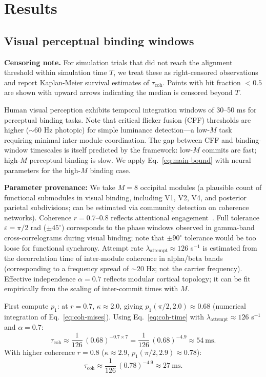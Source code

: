 \documentclass[12pt]{article}
\begin{document}
\section{Results}

\subsection{Visual perceptual binding windows}

\textbf{Censoring note.} For simulation trials that did not reach the alignment threshold within simulation time $T$, we treat these as right-censored observations and report Kaplan-Meier survival estimates of $\tau_{\mathrm{coh}}$. Points with hit fraction $< 0.5$ are shown with upward arrows indicating the median is censored beyond $T$.

Human visual perception exhibits temporal integration windows of 30--50 ms for perceptual binding tasks. Note that critical flicker fusion (CFF) thresholds are higher ($\sim$60 Hz photopic) for simple luminance detection---a low-$M$ task requiring minimal inter-module coordination. The gap between CFF and binding-window timescales is itself predicted by the framework: low-$M$ commits are fast; high-$M$ perceptual binding is slow. We apply Eq.~\ref{eq:main-bound} with neural parameters for the high-$M$ binding case.

\textbf{Parameter provenance:} We take $M=8$ occipital modules (a plausible count of functional submodules in visual binding, including V1, V2, V4, and posterior parietal subdivisions; can be estimated via community detection on coherence networks). Coherence $r=0.7$--$0.8$ reflects attentional engagement~\cite{fries2015}. Full tolerance $\varepsilon=\pi/2$ rad ($\pm 45^\circ$) corresponds to the phase windows observed in gamma-band cross-correlograms during visual binding; note that $\pm 90^\circ$ tolerance would be too loose for functional synchrony. Attempt rate $\lambda_{\mathrm{attempt}} \approx 126$ s$^{-1}$ is estimated from the decorrelation time of inter-module coherence in alpha/beta bands (corresponding to a frequency spread of $\sim 20$ Hz; not the carrier frequency). Effective independence $\alpha=0.7$ reflects modular cortical topology; it can be fit empirically from the scaling of inter-commit times with $M$.

First compute $p_1$: at $r=0.7$, $\kappa \approx 2.0$, giving $p_1(\pi/2, 2.0) \approx 0.68$ (numerical integration of Eq.~\ref{eq:coh-mises}). Using Eq.~\ref{eq:coh-time} with $\lambda_{\mathrm{attempt}} \approx 126$ s$^{-1}$ and $\alpha=0.7$:
\[
\tau_{\mathrm{coh}} \approx \frac{1}{126}\,(0.68)^{-0.7 \times 7}
= \frac{1}{126}\,(0.68)^{-4.9} \approx 54~\mathrm{ms}.
\]
With higher coherence $r=0.8$ ($\kappa \approx 2.9$, $p_1(\pi/2, 2.9) \approx 0.78$):
\[
\tau_{\mathrm{coh}} \approx \frac{1}{126}\,(0.78)^{-4.9} \approx 27~\mathrm{ms}.
\]
\end{document}
